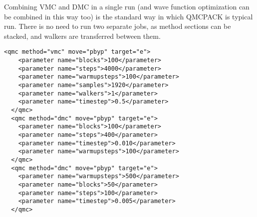 Combining VMC and DMC in a single run (and wave function optimization can be combined in this way too) is the standard way in which QMCPACK is typical run.   There is no need to run two separate jobs, as method sections can be stacked, and walkers are transferred between them.

\begin{lstlisting}[style=QMCPXML,caption=Combined VMC and DMC run ]
  <qmc method="vmc" move="pbyp" target="e">
    <parameter name="blocks">100</parameter>
    <parameter name="steps">4000</parameter>
    <parameter name="warmupsteps">100</parameter>
    <parameter name="samples">1920</parameter>
    <parameter name="walkers">1</parameter>
    <parameter name="timestep">0.5</parameter>
  </qmc>
  <qmc method="dmc" move="pbyp" target="e">
    <parameter name="blocks">100</parameter>
    <parameter name="steps">400</parameter>
    <parameter name="timestep">0.010</parameter>
    <parameter name="warmupsteps">100</parameter>
  </qmc>
  <qmc method="dmc" move="pbyp" target="e">
    <parameter name="warmupsteps">500</parameter>
    <parameter name="blocks">50</parameter>
    <parameter name="steps">100</parameter>
    <parameter name="timestep">0.005</parameter>
  </qmc>
\end{lstlisting}




